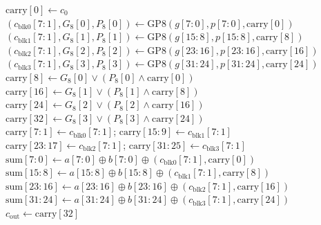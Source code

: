 \documentclass[a4paper, 11pt]{article}
\begin{document}
\begin{algorithm}[H]
\SetAlgoLined
{}
$\text{carry}[0] \gets c_0$\\
$(c_{\text{blk0}}[7:1], G_8[0], P_8[0]) \gets \text{GP8}(g[7:0], p[7:0], \text{carry}[0])$\\
$(c_{\text{blk1}}[7:1], G_8[1], P_8[1]) \gets \text{GP8}(g[15:8], p[15:8], \text{carry}[8])$\\
$(c_{\text{blk2}}[7:1], G_8[2], P_8[2]) \gets \text{GP8}(g[23:16], p[23:16], \text{carry}[16])$\\
$(c_{\text{blk3}}[7:1], G_8[3], P_8[3]) \gets \text{GP8}(g[31:24], p[31:24], \text{carry}[24])$\\
$\text{carry}[8] \gets G_8[0] \lor (P_8[0] \land \text{carry}[0])$\\
$\text{carry}[16] \gets G_8[1] \lor (P_8[1] \land \text{carry}[8])$\\
$\text{carry}[24] \gets G_8[2] \lor (P_8[2] \land \text{carry}[16])$\\
$\text{carry}[32] \gets G_8[3] \lor (P_8[3] \land \text{carry}[24])$\\
$\text{carry}[7:1] \gets c_{\text{blk0}}[7:1]$; 
$\text{carry}[15:9] \gets c_{\text{blk1}}[7:1]$\\
$\text{carry}[23:17] \gets c_{\text{blk2}}[7:1]$; 
$\text{carry}[31:25] \gets c_{\text{blk3}}[7:1]$\\
$\text{sum}[7:0] \gets a[7:0] \oplus b[7:0] \oplus (c_{\text{blk0}}[7:1], \text{carry}[0])$\\
$\text{sum}[15:8] \gets a[15:8] \oplus b[15:8] \oplus (c_{\text{blk1}}[7:1], \text{carry}[8])$\\
$\text{sum}[23:16] \gets a[23:16] \oplus b[23:16] \oplus (c_{\text{blk2}}[7:1], \text{carry}[16])$\\
$\text{sum}[31:24] \gets a[31:24] \oplus b[31:24] \oplus (c_{\text{blk3}}[7:1], \text{carry}[24])$\\
$c_{\text{out}} \gets \text{carry}[32]$\\
\caption{32-bit CLA Top-Level Algorithm}
\end{algorithm}
\end{document}
